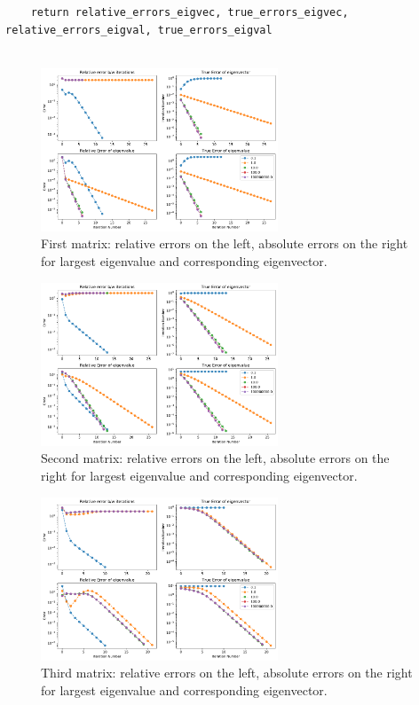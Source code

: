 \documentclass[12pt,twoside]{article}
\begin{document}
\begin{enumerate}
\begin{enumerate}
\begin{verbatim}
    return relative_errors_eigvec, true_errors_eigvec, relative_errors_eigval, true_errors_eigval
        
\end{verbatim}

\begin{figure}[H]
	\centering
	\includegraphics[width=200pt]{figures/random_init_2.pdf}
	\caption{First matrix: relative errors on the left,  absolute errors on the right for largest eigenvalue and corresponding eigenvector.
}	\label{fig1}
\end{figure}

\begin{figure}[H]
	\centering
	\includegraphics[width=200pt]{figures/random_init_3.pdf}
	\caption{Second matrix: relative errors on the left,  absolute errors on the right for largest eigenvalue and corresponding eigenvector.}
	\label{fig1}
\end{figure}

\begin{figure}[H]
	\centering
	\includegraphics[width=200pt]{figures/random_init_4.pdf}
	\caption{Third matrix: relative errors on the left,  absolute errors on the right for largest eigenvalue and corresponding eigenvector.}
	\label{fig1}
\end{figure}


\end{enumerate}

\end{enumerate}
\end{document}

